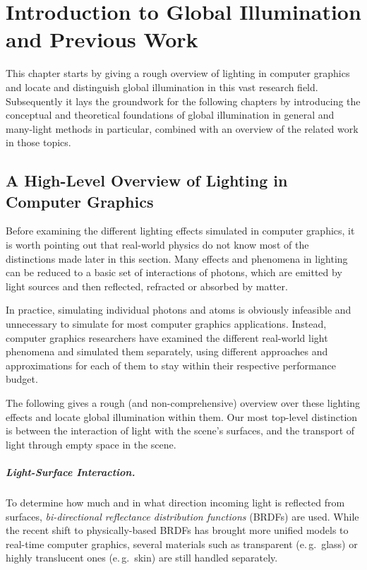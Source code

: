 
\chapter{Introduction to Global Illumination and Previous Work}
\label{chap:introductionGI}

This chapter starts by giving a rough overview of lighting in computer graphics and locate and distinguish global illumination in this vast research field.
Subsequently it lays the groundwork for the following chapters by introducing the conceptual and theoretical foundations of global illumination in general and many-light methods in particular, combined with an overview of the related work in those topics.


\section{A High-Level Overview of Lighting in Computer Graphics}

Before examining the different lighting effects simulated in computer graphics, it is worth pointing out that real-world physics do not know most of the distinctions made later in this section. Many effects and phenomena in lighting can be reduced to a basic set of interactions of photons, which are emitted by light sources and then reflected, refracted or absorbed by matter.

In practice, simulating individual photons and atoms is obviously infeasible and unnecessary to simulate for most computer graphics applications. Instead, computer graphics researchers have examined the different real-world light phenomena and simulated them separately, using different approaches and approximations for each of them to stay within their respective performance budget.


The following gives a rough (and non-comprehensive) overview over these lighting effects and locate global illumination within them. Our most top-level distinction is between the interaction of light with the scene's surfaces, and the transport of light through empty space in the scene.

\paragraph{Light-Surface Interaction.}

To determine how much and in what direction incoming light is reflected from surfaces, \textit{bi-directional reflectance distribution functions} (BRDFs) are used. While the recent shift to physically-based BRDFs has brought more unified models to real-time computer graphics, several materials such as transparent (e.\,g.\ glass) or highly translucent ones (e.\,g.\ skin) are still handled separately.



